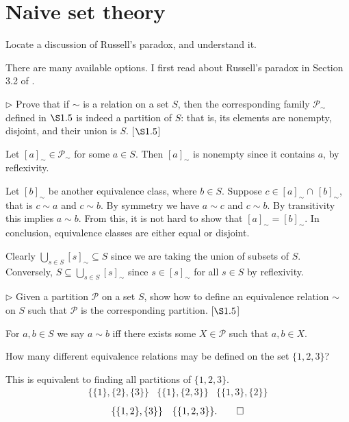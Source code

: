 \section{Naive set theory}
\extitle
\begin{exercise}
	Locate a discussion of Russell's paradox, and understand it.
\end{exercise}
\begin{solution}
	There are many available options. I first read about Russell's paradox in Section 3.2 of \cite{tao2014analysis}.
\end{solution}
\begin{exercise}
	$\triangleright$ Prove that if $\sim$ is a relation on a set $S$, then the corresponding family $\mathscr{P}_{\sim}$ defined in $\S1.5$  is indeed a partition of $S$: that is, its elements are nonempty, disjoint, and their union is $S$. [$\S1.5$]
\end{exercise}
\begin{solution}
	Let $[a]_\sim\in \mathscr{P}_{\sim}$ for some $a\in S$. Then $[a]_\sim$ is nonempty since it contains $a$, by reflexivity. 
	
	Let $[b]_\sim$ be another equivalence class, where $b\in S$. Suppose $c\in [a]_\sim \cap\, [b]_\sim$, that is $c\sim a$ and $c \sim b$. By symmetry we have $a \sim c$ and $c \sim b$. By transitivity this implies $a\sim b$. From this, it is not hard to show that $[a]_\sim = [b]_\sim$. In conclusion, equivalence classes are either equal or disjoint.
	
	Clearly $\bigcup_{s\in S} [s]_\sim \subseteq S$ since we are taking the union of subsets of $S$. Conversely, $S\subseteq \bigcup_{s\in S} [s]_\sim$ since $s\in [s]_{\sim}$ for all $s\in S$ by reflexivity. 
\end{solution}
\begin{exercise}
	$\triangleright$ Given a partition $\mathscr{P}$ on a set $S$, show how to define an equivalence relation $\sim$ on $S$ such that $\mathscr{P}$ is the corresponding partition. [$\S1.5$]
\end{exercise}
\begin{solution}
	For $a,b\in S$ we say $a\sim b$ iff there exists some $X \in \mathscr{P}$ such that $a,b\in X$. 
\end{solution}
\begin{exercise}
	How many different equivalence relations may be defined on the set $\{1,2,3\}$?
\end{exercise}
\begin{solution}
	This is equivalent to finding all partitions of $\{1,2,3\}$.
	\[
	\begin{matrix}
		\{\{1\},\{2\},\{3\}\} & \{\{1\}, \{2,3\}\} & \{\{1,3\},\{2\}\}
	\end{matrix}
	\]
	\[
		\begin{matrix}
			\{\{1,2\},\{3\}\} & \{\{1,2,3\}\}.
		\end{matrix}\qedhere
	\]
\end{solution}
